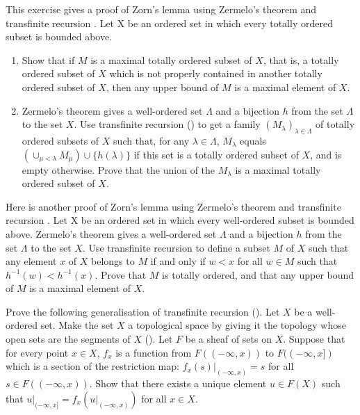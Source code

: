 \documentclass{article}
\begin{document}
\begin{exercise}
  \label{exe:9d868h6m}
  This exercise gives a proof of Zorn's lemma using Zermelo's theorem
  and transfinite recursion \parencite[Chapter~II,
  Theorem~9.4]{bib:h8xsxpp7}.  Let X be an ordered set in which every
  totally ordered subset is bounded above.
  \begin{enumerate}
  \item \label{item:ebwyq3lr} Show that if \(M\) is a maximal totally
    ordered subset of \(X\), that is, a totally ordered subset of
    \(X\) which is not properly contained in another totally ordered
    subset of \(X\), then any upper bound of \(M\) is a maximal
    element of \(X\).
  \item Zermelo's theorem gives a well-ordered set \(\Lambda\) and a
    bijection \(h\) from the set \(\Lambda\) to the set \(X\).  Use
    transfinite recursion () to get a family
    \((M_\lambda)_{\lambda \in \Lambda}\) of totally ordered subsets
    of \(X\) such that, for any \(\lambda \in \Lambda\), \(M_\lambda\)
    equals \((\cup_{\mu < \lambda} M_\mu) \cup \{ h(\lambda) \}\) if
    this set is a totally ordered subset of \(X\), and is empty
    otherwise.  Prove that the union of the \(M_\lambda\) is a maximal
    totally ordered subset of \(X\).
  \end{enumerate}
\end{exercise}

\begin{exercise}
  \label{exe:5qa65h5w}
  Here is another proof of Zorn's lemma using Zermelo's theorem and
  transfinite recursion \parencite[Part~II, Chapter~14,
  Solution~1]{bib:uw2wsr3k}.  Let X be an ordered set in which every
  well-ordered subset is bounded above.  Zermelo's theorem gives a
  well-ordered set \(\Lambda\) and a bijection \(h\) from the set
  \(\Lambda\) to the set \(X\).  Use transfinite recursion to define a
  subset \(M\) of \(X\) such that any element \(x\) of \(X\) belongs
  to \(M\) if and only if \(w < x\) for all \(w \in M\) such that
  \(h^{-1}(w) < h^{-1}(x)\).  Prove that \(M\) is totally ordered, and
  that any upper bound of \(M\) is a maximal element of \(X\).
\end{exercise}

\begin{exercise}
  \label{exe:x9ewqbv6}
  Prove the following generalisation of transfinite recursion
  ().  Let \(X\) be a well-ordered set.  Make the
  set \(X\) a topological space by giving it the topology whose open
  sets are the segments of \(X\) ().  Let \(F\) be
  a sheaf of sets on \(X\).  Suppose that for every point \(x \in X\),
  \(f_x\) is a function from \(F((-\infty, x))\) to
  \(F((-\infty, x])\) which is a section of the restriction map:
  \(f_x(s) \vert_{(-\infty, x)} = s\) for all
  \(s \in F((-\infty, x))\).  Show that there exists a unique element
  \(u \in F(X)\) such that
  \(u \vert_{(-\infty, x]} = f_x(u \vert_{(-\infty, x)})\) for all
  \(x \in X\).
\end{exercise}
\end{document}
